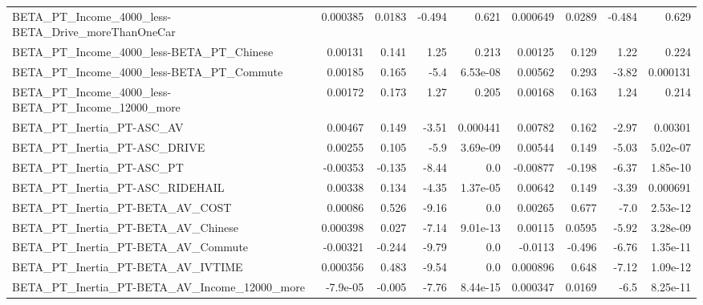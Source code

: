 \begin{tabular}{lrrrrrrrr}
BETA\_PT\_Income\_4000\_less-BETA\_Drive\_moreThanOneCar &    0.000385 &       0.0183 &   -0.494 &    0.621 &   0.000649 &      0.0289 &       -0.484 &         0.629 \\
BETA\_PT\_Income\_4000\_less-BETA\_PT\_Chinese           &     0.00131 &        0.141 &     1.25 &    0.213 &    0.00125 &       0.129 &         1.22 &         0.224 \\
BETA\_PT\_Income\_4000\_less-BETA\_PT\_Commute           &     0.00185 &        0.165 &     -5.4 & 6.53e-08 &    0.00562 &       0.293 &        -3.82 &      0.000131 \\
BETA\_PT\_Income\_4000\_less-BETA\_PT\_Income\_12000\_more &     0.00172 &        0.173 &     1.27 &    0.205 &    0.00168 &       0.163 &         1.24 &         0.214 \\
BETA\_PT\_Inertia\_PT-ASC\_AV                          &     0.00467 &        0.149 &    -3.51 & 0.000441 &    0.00782 &       0.162 &        -2.97 &       0.00301 \\
BETA\_PT\_Inertia\_PT-ASC\_DRIVE                       &     0.00255 &        0.105 &     -5.9 & 3.69e-09 &    0.00544 &       0.149 &        -5.03 &      5.02e-07 \\
BETA\_PT\_Inertia\_PT-ASC\_PT                          &    -0.00353 &       -0.135 &    -8.44 &      0.0 &   -0.00877 &      -0.198 &        -6.37 &      1.85e-10 \\
BETA\_PT\_Inertia\_PT-ASC\_RIDEHAIL                    &     0.00338 &        0.134 &    -4.35 & 1.37e-05 &    0.00642 &       0.149 &        -3.39 &      0.000691 \\
BETA\_PT\_Inertia\_PT-BETA\_AV\_COST                    &     0.00086 &        0.526 &    -9.16 &      0.0 &    0.00265 &       0.677 &         -7.0 &      2.53e-12 \\
BETA\_PT\_Inertia\_PT-BETA\_AV\_Chinese                 &    0.000398 &        0.027 &    -7.14 & 9.01e-13 &    0.00115 &      0.0595 &        -5.92 &      3.28e-09 \\
BETA\_PT\_Inertia\_PT-BETA\_AV\_Commute                 &    -0.00321 &       -0.244 &    -9.79 &      0.0 &    -0.0113 &      -0.496 &        -6.76 &      1.35e-11 \\
BETA\_PT\_Inertia\_PT-BETA\_AV\_IVTIME                  &    0.000356 &        0.483 &    -9.54 &      0.0 &   0.000896 &       0.648 &        -7.12 &      1.09e-12 \\
BETA\_PT\_Inertia\_PT-BETA\_AV\_Income\_12000\_more       &    -7.9e-05 &       -0.005 &    -7.76 & 8.44e-15 &   0.000347 &      0.0169 &         -6.5 &      8.25e-11 \\

\end{tabular}
